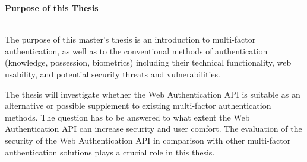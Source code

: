 \thispagestyle{empty}

{}

\begin{large}
	\textbf{Purpose of this Thesis} \\ \\
\end{large}

The purpose of this master's thesis is an introduction to multi-factor authentication, as well as to the conventional methods of authentication (knowledge, possession, biometrics) including their technical functionality, web usability, and potential security threats and vulnerabilities.

The thesis will investigate whether the Web Authentication API is suitable as an alternative or possible supplement to existing multi-factor authentication methods. The question has to be answered to what extent the Web Authentication API can increase security and user comfort. The evaluation of the security of the Web Authentication API in comparison with other multi-factor authentication solutions plays a crucial role in this thesis.

\newpage